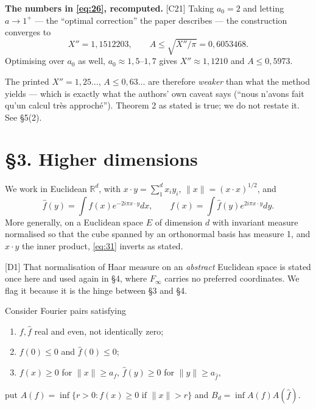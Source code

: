 \documentclass[11pt,reqno]{amsart}
\theoremstyle{plain}
\theoremstyle{definition}
\theoremstyle{remark}
\newcommand{\R}{\mathbb{R}}
\newcommand{\fh}{\widehat{f}}
\newcommand{\Ledger}[1]{{\scriptsize\textsf{[#1]}}}
\begin{document}
\begin{expansion}
\textbf{The numbers in \eqref{eq:26}, recomputed.} \Ledger{C21} Taking $a_0=2$ and
letting $a\to1^+$ --- the ``optimal correction'' the paper describes --- the
construction converges to
\[X''=1{,}1512203,\qquad A\le\sqrt{X''/\pi}=0{,}6053468 .\]
Optimising over $a_0$ as well, $a_0\approx1{,}5$--$1{,}7$ gives $X''\approx1{,}1210$
and $A\le0{,}5973$.

The printed $X''=1{,}25\ldots$, $A\le0{,}63\ldots$ are therefore \emph{weaker} than
what the method yields --- which is exactly what the authors' own caveat says
(``nous n'avons fait qu'un calcul tr\`es approch\'e''). Theorem 2 as stated is true;
we do not restate it. See \S5(2).
\end{expansion}

\section*{\S3. Higher dimensions}

We work in Euclidean $\R^d$, with $x\cdot y=\sum_1^dx_iy_i$, $\|x\|=(x\cdot x)^{1/2}$,
and
\begin{equation}\label{eq:31}
 \fh(y)=\int f(x)e^{-2i\pi x\cdot y}dx,\qquad
 f(x)=\int\fh(y)e^{2i\pi x\cdot y}dy .
\end{equation}
More generally, on a Euclidean space $E$ of dimension $d$ with invariant measure
normalised so that the cube spanned by an orthonormal basis has measure 1, and $x\cdot
y$ the inner product, \eqref{eq:31} inverts as stated.

\begin{ournotation}
\Ledger{D1} That normalisation of Haar measure on an \emph{abstract} Euclidean space
is stated once here and used again in \S4, where $F_\infty$ carries no preferred
coordinates. We flag it because it is the hinge between \S3 and \S4.
\end{ournotation}

Consider Fourier pairs satisfying
\begin{enumerate}[label=\textbf{\arabic*)},leftmargin=2.4em]
\item $f,\fh$ real and even, not identically zero;
\item $f(0)\le0$ and $\fh(0)\le0$;
\item $f(x)\ge0$ for $\|x\|\ge a_f$, $\fh(y)\ge0$ for $\|y\|\ge a_{\fh}$,
\end{enumerate}
put $A(f)=\inf\{r>0:f(x)\ge0\text{ if }\|x\|>r\}$ and $B_d=\inf A(f)A(\fh)$.
\end{document}

